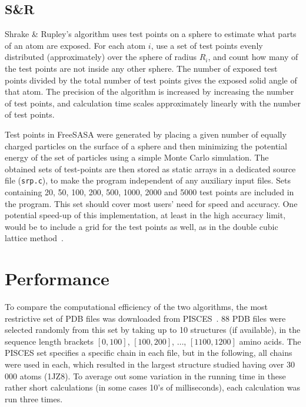 \documentclass[a4paper,11pt]{article}
\begin{document}
\subsection{S\&R}

Shrake \& Rupley's algorithm uses test points on a sphere to estimate
what parts of an atom are exposed. For each atom $i$, use a set of
test points evenly distributed (approximately) over the sphere of
radius $R_i$, and count how many of the test points are not inside any
other sphere. The number of exposed test points divided by the total
number of test points gives the exposed solid angle of that atom. The
precision of the algorithm is increased by increasing the number of
test points, and calculation time scales approximately linearly with
the number of test points.

Test points in FreeSASA were generated by placing a given number of
equally charged particles on the surface of a sphere and then
minimizing the potential energy of the set of particles using a simple
Monte Carlo simulation. The obtained sets of test-points are then
stored as static arrays in a dedicated source file (\texttt{srp.c}),
to make the program independent of any auxiliary input files. Sets
containing 20, 50, 100, 200, 500, 1000, 2000 and 5000 test points are
included in the program. This set should cover most users' need for
speed and accuracy. One potential speed-up of this implementation, at
least in the high accuracy limit, would be to include a grid for the
test points as well, as in the double cubic lattice
method~\cite{DCLM}.
 
\section{Performance}\label{sec:performance}

To compare the computational efficiency of the two algorithms, the
most restrictive set of PDB files was downloaded from
PISCES~\cite{PISCES}.  88 PDB files were selected randomly from this
set by taking up to 10 structures (if available), in the sequence
length brackets $[0,100]$, $[100,200]$, $\dots$, $[1100,1200]$ amino
acids. The PISCES set specifies a specific chain in each file, but in
the following, all chains were used in each, which resulted in the
largest structure studied having over 30\,000 atoms (1JZ8). To average
out some variation in the running time in these rather short
calculations (in some cases 10's of milliseconds), each calculation was
run three times.
\end{document}
